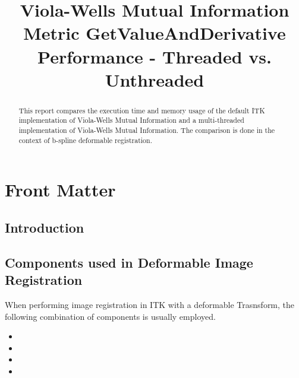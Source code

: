 \documentclass{InsightArticle}
\title{Viola-Wells Mutual Information Metric GetValueAndDerivative Performance - Threaded vs. Unthreaded}
\begin{document}
\ifpdf
\else
\fi


\maketitle


\ifhtml
\chapter*{Front Matter\label{front}}
\fi


\begin{abstract}
\noindent
This report compares the execution time and memory usage of the default ITK implementation of Viola-Wells Mutual Information
and a multi-threaded implementation of Viola-Wells Mutual Information. The comparison is done in the context of b-spline
deformable registration.
\end{abstract}

\tableofcontents

\section{Introduction}



\section{Components used in Deformable Image Registration}

When performing image registration in ITK with a deformable Trasnsform, the
following combination of components is usually employed.

\begin{itemize}
\item {}
\item {}
\item {}
\item {}
\end{itemize}
\end{document}
